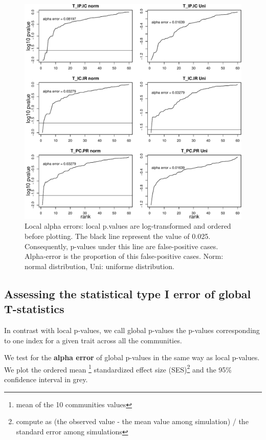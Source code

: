 \documentclass[12pt]{article}\usepackage[]{graphicx}\usepackage[]{color}
\makeatletter
\def\maxwidth{ %
  \ifdim\Gin@nat@width>\linewidth
    \linewidth
  \else
    \Gin@nat@width
  \fi
}
\newenvironment{knitrout}{}{} %
\makeatother
\begin{document}
\begin{knitrout}
\begin{figure}
{\centering \includegraphics[width=\maxwidth]{figure/No_Filter_results-1} 

}

\caption[Local alpha errors]{Local alpha errors: local p.values are log-transformed and ordered before plotting. The black line represent the value of 0.025. Consequently, p-values under this line are false-positive cases. Alpha-error is the proportion of this false-positive cases. Norm: normal distribution, Uni: uniforme distribution.}\label{fig:No_Filter_results}
\end{figure}


\end{knitrout}

 \subsection {Assessing the statistical type I error of global T-statistics}

In contrast with local p-values, we call global p-values the p-values corresponding to one index for a given trait across all the communities. 

We test for the \textbf{alpha error} of global p-values in the same way as local p-values. We plot the ordered mean \footnote{mean of the 10 communities values} standardized effect size (SES)\footnote{compute as (the observed value - the mean value among simulation) / the standard error among simulations} and the 95\% confidence interval in grey. 
\end{document}
